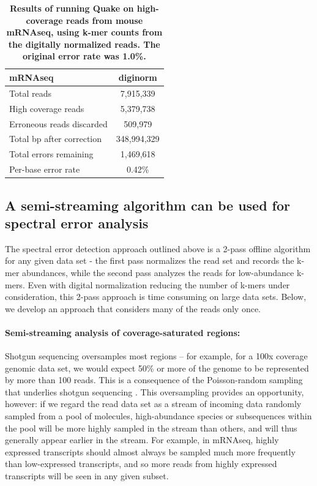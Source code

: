 \documentclass{article}
\begin{document}
\begin{table}
\centering
\begin{tabular}{|l|c|}
\hline
{\bf mRNAseq}                    & diginorm \\
\hline
Total reads                      & 7,915,339 \\
High coverage reads              & 5,379,738 \\
Erroneous reads discarded        & 509,979 \\
Total bp after correction        & 348,994,329 \\
Total errors remaining           & 1,469,618 \\
Per-base error rate              & 0.42\% \\
\hline
\end{tabular}

\caption{{\bf Results of running Quake on high-coverage reads from
    mouse mRNAseq, using k-mer counts from the digitally normalized reads.
    The original error rate was 1.0\%.}}

\label{tab:quake_mrna}
\end{table}

\subsection{A semi-streaming algorithm can be used for spectral error analysis}

The spectral error detection approach outlined above is a 2-pass
offline algorithm for any given data set - the first pass normalizes
the read set and records the k-mer abundances, while the second pass
analyzes the reads for low-abundance k-mers.  Even with digital
normalization reducing the number of k-mers under consideration, this
2-pass approach is time consuming on large data sets.  Below, we
develop an approach that considers many of the
reads only once.

\paragraph{Semi-streaming analysis of coverage-saturated regions:}

Shotgun sequencing oversamples most regions -- for example, for a 100x
coverage genomic data set, we would expect 50\% or more of the genome
to be represented by more than 100 reads.  This is a consequence of
the Poisson-random sampling that underlies shotgun sequencing
\cite{waterman}.  This oversampling provides an opportunity, however:
if we regard the read data set as a stream of incoming data randomly
sampled from a pool of molecules, high-abundance species or
subsequences within the pool will be more highly sampled in the stream
than others, and will thus generally appear earlier in the stream.
For example, in mRNAseq, highly expressed transcripts should almost
always be sampled much more frequently than low-expressed transcripts,
and so more reads from highly expressed transcripts will be seen in
any given subset.
\end{document}

